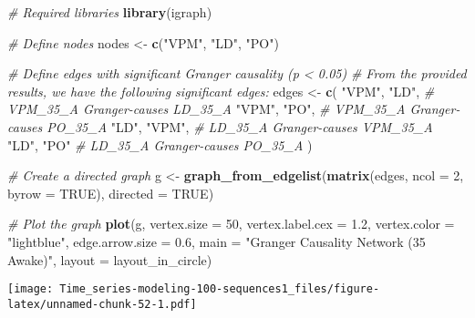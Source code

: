 \documentclass[
]{article}
\newenvironment{Shaded}{\begin{snugshade}}{\end{snugshade}}
\newcommand{\AttributeTok}[1]{\textcolor[rgb]{0.13,0.29,0.53}{#1}}
\newcommand{\CommentTok}[1]{\textcolor[rgb]{0.56,0.35,0.01}{\textit{#1}}}
\newcommand{\ConstantTok}[1]{\textcolor[rgb]{0.56,0.35,0.01}{#1}}
\newcommand{\DecValTok}[1]{\textcolor[rgb]{0.00,0.00,0.81}{#1}}
\newcommand{\FloatTok}[1]{\textcolor[rgb]{0.00,0.00,0.81}{#1}}
\newcommand{\FunctionTok}[1]{\textcolor[rgb]{0.13,0.29,0.53}{\textbf{#1}}}
\newcommand{\NormalTok}[1]{#1}
\newcommand{\OtherTok}[1]{\textcolor[rgb]{0.56,0.35,0.01}{#1}}
\newcommand{\StringTok}[1]{\textcolor[rgb]{0.31,0.60,0.02}{#1}}
\begin{document}
\begin{Shaded}
\begin{Highlighting}[]
\CommentTok{\# Required libraries}
\FunctionTok{library}\NormalTok{(igraph)}

\CommentTok{\# Define nodes}
\NormalTok{nodes }\OtherTok{\textless{}{-}} \FunctionTok{c}\NormalTok{(}\StringTok{"VPM"}\NormalTok{, }\StringTok{"LD"}\NormalTok{, }\StringTok{"PO"}\NormalTok{)}

\CommentTok{\# Define edges with significant Granger causality (p \textless{} 0.05)}
\CommentTok{\# From the provided results, we have the following significant edges:}
\NormalTok{edges }\OtherTok{\textless{}{-}} \FunctionTok{c}\NormalTok{(}
  \StringTok{"VPM"}\NormalTok{, }\StringTok{"LD"}\NormalTok{,  }\CommentTok{\# VPM\_35\_A Granger{-}causes LD\_35\_A}
  \StringTok{"VPM"}\NormalTok{, }\StringTok{"PO"}\NormalTok{,  }\CommentTok{\# VPM\_35\_A Granger{-}causes PO\_35\_A}
  \StringTok{"LD"}\NormalTok{, }\StringTok{"VPM"}\NormalTok{,  }\CommentTok{\# LD\_35\_A Granger{-}causes VPM\_35\_A}
  \StringTok{"LD"}\NormalTok{, }\StringTok{"PO"}   \CommentTok{\# LD\_35\_A Granger{-}causes PO\_35\_A}
\NormalTok{)}

\CommentTok{\# Create a directed graph}
\NormalTok{g }\OtherTok{\textless{}{-}} \FunctionTok{graph\_from\_edgelist}\NormalTok{(}\FunctionTok{matrix}\NormalTok{(edges, }\AttributeTok{ncol =} \DecValTok{2}\NormalTok{, }\AttributeTok{byrow =} \ConstantTok{TRUE}\NormalTok{), }\AttributeTok{directed =} \ConstantTok{TRUE}\NormalTok{)}

\CommentTok{\# Plot the graph}
\FunctionTok{plot}\NormalTok{(g,}
     \AttributeTok{vertex.size =} \DecValTok{50}\NormalTok{,}
     \AttributeTok{vertex.label.cex =} \FloatTok{1.2}\NormalTok{,}
     \AttributeTok{vertex.color =} \StringTok{"lightblue"}\NormalTok{,}
     \AttributeTok{edge.arrow.size =} \FloatTok{0.6}\NormalTok{,}
     \AttributeTok{main =} \StringTok{"Granger Causality Network (35 Awake)"}\NormalTok{,}
     \AttributeTok{layout =}\NormalTok{ layout\_in\_circle)}
\end{Highlighting}
\end{Shaded}

\texttt{[image: Time\_series-modeling-100-sequences1\_files/figure-latex/unnamed-chunk-52-1.pdf]}
\end{document}
